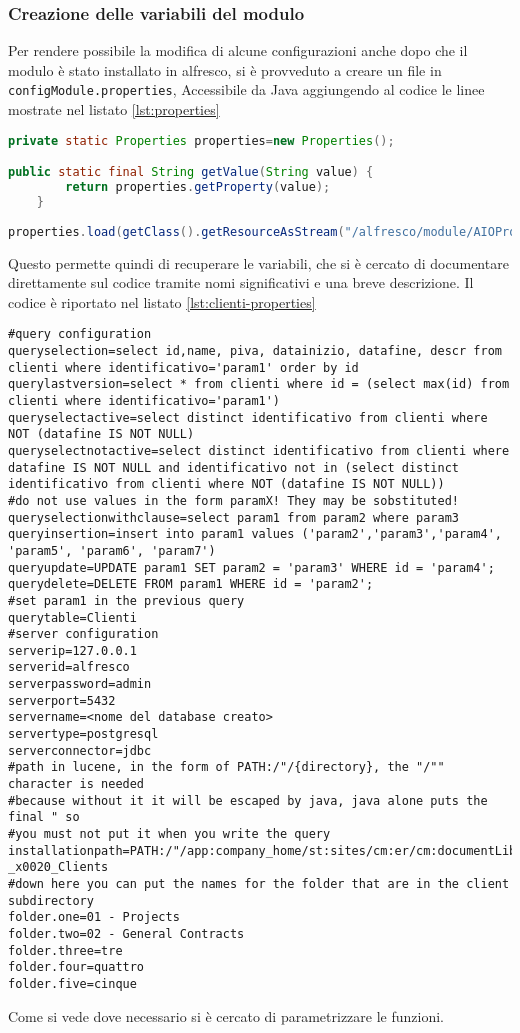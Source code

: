 \subsubsection{Creazione delle variabili del modulo}
Per rendere possibile la modifica di alcune configurazioni anche dopo che il modulo è stato installato in alfresco, si è provveduto a creare un file in \texttt{configModule.properties}, Accessibile da Java aggiungendo al codice le linee mostrate nel listato \ref{lst:properties}
\begin{lstlisting}[language=Java, caption= inclusione delle properties, label=lst:properties]
private static Properties properties=new Properties();

public static final String getValue(String value) {
		return properties.getProperty(value);
	}
	
properties.load(getClass().getResourceAsStream("/alfresco/module/AIOProject-repo-amp/config/configModule.properties"));
\end{lstlisting}
Questo permette quindi di recuperare le variabili, che si è cercato di documentare direttamente sul codice tramite nomi significativi e una breve descrizione. Il codice è riportato nel listato \ref{lst:clienti-properties}
\begin{lstlisting}[caption=contenuto di configModule.properties,label=lst:clienti-properties]
#query configuration
queryselection=select id,name, piva, datainizio, datafine, descr from clienti where identificativo='param1' order by id
querylastversion=select * from clienti where id = (select max(id) from clienti where identificativo='param1')
queryselectactive=select distinct identificativo from clienti where NOT (datafine IS NOT NULL)
queryselectnotactive=select distinct identificativo from clienti where datafine IS NOT NULL and identificativo not in (select distinct identificativo from clienti where NOT (datafine IS NOT NULL))
#do not use values in the form paramX! They may be sobstituted!
queryselectionwithclause=select param1 from param2 where param3
queryinsertion=insert into param1 values ('param2','param3','param4', 'param5', 'param6', 'param7')
queryupdate=UPDATE param1 SET param2 = 'param3' WHERE id = 'param4';
querydelete=DELETE FROM param1 WHERE id = 'param2';
#set param1 in the previous query
querytable=Clienti
#server configuration
serverip=127.0.0.1
serverid=alfresco
serverpassword=admin
serverport=5432
servername=<nome del database creato>
servertype=postgresql
serverconnector=jdbc
#path in lucene, in the form of PATH:/"/{directory}, the "/"" character is needed 
#because without it it will be escaped by java, java alone puts the final " so 
#you must not put it when you write the query
installationpath=PATH:/"/app:company_home/st:sites/cm:er/cm:documentLibrary/cm:_x0030_2_x0020_-_x0020_Clients
#down here you can put the names for the folder that are in the client subdirectory
folder.one=01 - Projects
folder.two=02 - General Contracts
folder.three=tre
folder.four=quattro
folder.five=cinque
\end{lstlisting}
Come si vede dove necessario si è cercato di parametrizzare le funzioni.


